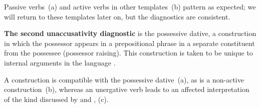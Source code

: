 \begin{exe}
\begin{xlist}
\begin{exe}
\begin{xlist}
\begin{exe}
\begin{xlist}
\begin{exe}
\begin{exe}
\begin{xlist}
\begin{exe}
\begin{xlist}
 \begin{exe}
 \ex  
 \begin{xlist} 
	
	
 \z
\z 

Passive verbs~(\nextx a) and active verbs in other templates~(\nextx b) pattern as expected; we will return to these templates later on, but the diagnostics are consistent.
 \begin{exe}
 \ex  
 \begin{xlist} 
	
	
 \z
\z 

\textbf{The second unaccusativity diagnostic} is the possessive dative, a construction in which the possessor appears in a prepositional phrase in a separate constituent from the possessee (possessor raising). This construction is taken to be unique to internal arguments in the language \citep{borergrodzinsky86,borer98csli}.

A  construction is compatible with the possessive dative~(\nextx a), as is a non-active construction~(\nextx b), whereas an unergative verb leads to an affected interpretation of the kind discussed by \cite{arieletal15} and \cite{barashersiegalboneh16}, (\nextx c). 

 \begin{exe}
 \ex  
 \begin{xlist} 
	

\end{xlist}
\end{exe}
\end{xlist}
\end{exe}
\end{xlist}
\end{exe}
\end{xlist}
\end{exe}
\end{xlist}
\end{exe}
\end{exe}
\end{xlist}
\end{exe}
\end{xlist}
\end{exe}
\end{xlist}
\end{exe}
